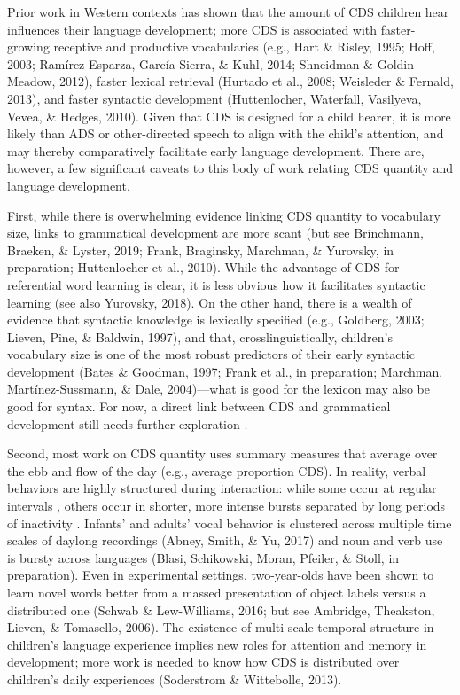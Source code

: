 \documentclass[floatsintext,man]{apa6}
\theoremstyle{definition}
\theoremstyle{definition}
\theoremstyle{definition}
\theoremstyle{remark}
\begin{document}
Prior work in Western contexts has shown that the amount of CDS children
hear influences their language development; more CDS is associated with
faster-growing receptive and productive vocabularies (e.g., Hart \&
Risley, 1995; Hoff, 2003; Ramírez-Esparza, García-Sierra, \& Kuhl, 2014;
Shneidman \& Goldin-Meadow, 2012), faster lexical retrieval (Hurtado et
al., 2008; Weisleder \& Fernald, 2013), and faster syntactic development
(Huttenlocher, Waterfall, Vasilyeva, Vevea, \& Hedges, 2010). Given that
CDS is designed for a child hearer, it is more likely than ADS or
other-directed speech to align with the child's attention, and may
thereby comparatively facilitate early language development. There are,
however, a few significant caveats to this body of work relating CDS
quantity and language development.

First, while there is overwhelming evidence linking CDS quantity to
vocabulary size, links to grammatical development are more scant (but
see Brinchmann, Braeken, \& Lyster, 2019; Frank, Braginsky, Marchman, \&
Yurovsky, in preparation; Huttenlocher et al., 2010). While the
advantage of CDS for referential word learning is clear, it is less
obvious how it facilitates syntactic learning (see also Yurovsky, 2018).
On the other hand, there is a wealth of evidence that syntactic
knowledge is lexically specified (e.g., Goldberg, 2003; Lieven, Pine, \&
Baldwin, 1997), and that, crosslinguistically, children's vocabulary
size is one of the most robust predictors of their early syntactic
development (Bates \& Goodman, 1997; Frank et al., in preparation;
Marchman, Martínez-Sussmann, \& Dale, 2004)---what is good for the
lexicon may also be good for syntax. For now, a direct link between CDS
and grammatical development still needs further exploration .

Second, most work on CDS quantity uses summary measures that average
over the ebb and flow of the day (e.g., average proportion CDS). In
reality, verbal behaviors are highly structured during interaction:
while some occur at regular intervals , others occur in shorter, more
intense bursts separated by long periods of inactivity . Infants' and
adults' vocal behavior is clustered across multiple time scales of
daylong recordings (Abney, Smith, \& Yu, 2017) and noun and verb use is
bursty across languages (Blasi, Schikowski, Moran, Pfeiler, \& Stoll, in
preparation). Even in experimental settings, two-year-olds have been
shown to learn novel words better from a massed presentation of object
labels versus a distributed one (Schwab \& Lew-Williams, 2016; but see
Ambridge, Theakston, Lieven, \& Tomasello, 2006). The existence of
multi-scale temporal structure in children's language experience implies
new roles for attention and memory in development; more work is needed
to know how CDS is distributed over children's daily experiences
(Soderstrom \& Wittebolle, 2013).
\end{document}
